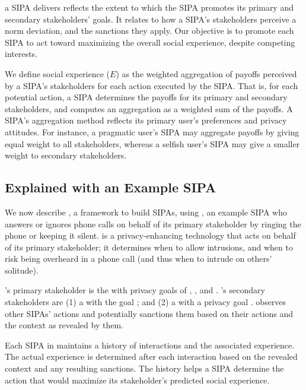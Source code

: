  a SIPA delivers reflects the extent to which the SIPA promotes its primary and secondary stakeholders' goals. It relates to how a SIPA's stakeholders perceive a norm deviation, and the sanctions they apply. Our objective is to promote each SIPA to act toward maximizing the overall social experience, despite competing interests. 

We define social experience ($E$) as the weighted aggregation of payoffs perceived by a SIPA's stakeholders for each action executed by the SIPA. That is, for each potential action, a SIPA determines the payoffs for its primary and secondary stakeholders, and computes an aggregation as a weighted sum of the payoffs.
%
A SIPA's aggregation method reflects its primary user's preferences and privacy attitudes. For instance, a pragmatic user's SIPA may aggregate payoffs by giving equal weight to all stakeholders, whereas a selfish user's SIPA may give a smaller weight to secondary stakeholders.

\subsection{\frameworkB Explained with an Example SIPA} 
%
We now describe \frameworkB, a framework to build SIPAs, using \ringer, an example SIPA who answers or ignores phone calls on behalf of its primary stakeholder by ringing the phone or keeping it silent. \ringer is a privacy-enhancing technology that acts on behalf of its primary stakeholder; it determines when to allow intrusions, and when to risk being overheard in a phone call (and thus when to intrude on others' solitude).

\ringer's primary stakeholder is the  with privacy goals of , , and . \ringer's secondary stakeholders are (1) a  with the goal ; and (2) a  with a privacy goal . \ringer observes other SIPAs' actions and potentially sanctions them based on their actions and the context as revealed by them.

Each SIPA in \frameworkB maintains a history of interactions and the associated experience. The actual experience is determined after each interaction based on the revealed context and any resulting sanctions. The history helps a SIPA determine the action that would maximize its stakeholder's predicted social experience. 

